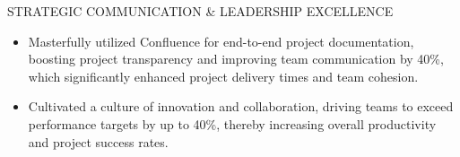 \documentclass{resume} %
\begin{document}

\begin{rSection}{STRATEGIC COMMUNICATION \& LEADERSHIP EXCELLENCE} 

\begin{itemize}
    \item Masterfully utilized Confluence for end-to-end project documentation, boosting project transparency and improving team communication by 40\%, which significantly enhanced project delivery times and team cohesion.
    \item Cultivated a culture of innovation and collaboration, driving teams to exceed performance targets by up to 40\%, thereby increasing overall productivity and project success rates.
\end{itemize}

\end{rSection}
\end{document}
